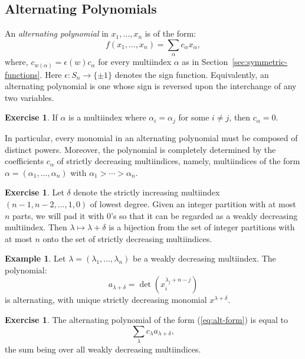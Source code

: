 \documentclass[11pt]{amsart}
\theoremstyle{definition}
\theoremstyle{example}
\newtheorem{example}[theorem]{Example}
\newtheorem{exercise}[theorem]{Exercise}
\begin{document}
\subsection{Alternating Polynomials}
\label{sec:alt-poly}
An \emph{alternating polynomial} in $x_1,\dotsc, x_n$ is of the form:
\begin{equation}
  \label{eq:alt-form}
  f(x_1,\dotsc,x_n) = \sum_{\alpha} c_\alpha x_\alpha,
\end{equation}
where, $c_{w(\alpha)} = \epsilon(w)c_\alpha$ for every multiindex $\alpha$ as in Section~\ref{sec:symmetric-functions}.
Here $\epsilon:S_n\to \{\pm 1\}$ denotes the sign function.
Equivalently, an alternating polynomial is one whose sign is reversed upon the interchange of any two variables.
\begin{exercise}
  If $\alpha$ is a multiindex where $\alpha_i=\alpha_j$ for some $i\neq j$, then $c_\alpha = 0$.
\end{exercise}
In particular, every monomial in an alternating polynomial must be composed of distinct powers.
Moreover, the polynomial is completely determined by the coefficients $c_\alpha$ of strictly decreasing multiindices, namely, multiindices of the form $\alpha=(\alpha_1,\dotsc,\alpha_n)$ with $\alpha_1>\dotsb>\alpha_n$.
\begin{exercise}
  Let $\delta$ denote the strictly increasing multiindex $(n-1,n-2,\dotsc,1, 0)$ of lowest degree.
  Given an integer partition with at most $n$ parts, we will pad it with $0$'s so that it can be regarded as a weakly decreasing multiindex.
  Then $\lambda\mapsto \lambda+\delta$ is a bijection from the set of integer partitions with at most $n$ onto the set of strictly decreasing multiindices.
\end{exercise}
\begin{example}
  Let $\lambda = (\lambda_1,\dotsc, \lambda_n)$ be a weakly decreasing multiindex.
  The polynomial:
  \begin{displaymath}
    a_{\lambda+\delta} = \det(x_i^{\lambda_j + n - j})
  \end{displaymath}
  is alternating, with unique strictly decreasing monomial $x^{\lambda+\delta}$.
\end{example}
\begin{exercise}
  \label{exercise:alt-basis}
  The alternating polynomial of the form \textup{(\ref{eq:alt-form})} is equal to  \begin{displaymath}
    \sum_{\lambda} c_\lambda a_{\lambda+\delta},
  \end{displaymath}
  the sum being over all weakly decreasing multiindices.
\end{exercise}
\end{document}
